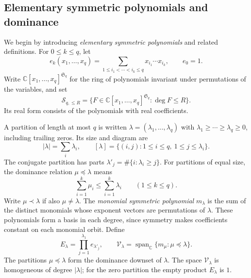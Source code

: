 \documentclass[reqno, 12pt]{article}
\numberwithin{equation}{section}
\theoremstyle{definition}
\newcommand{\CC}{\mathbb C}
\begin{document}
\subsection{Elementary symmetric polynomials and dominance}

We begin by introducing \emph{elementary symmetric polynomials} and related definitions.
For $0\leq k\leq q$, let
\[
e_k(x_1,\ldots,x_q)=
\sum_{1\leq i_1<\cdots<i_k\leq q}x_{i_1}\cdots x_{i_k},
\qquad e_0=1.
\]
Write $\CC[x_1,\ldots,x_q]^{\mathfrak S_q}$ for the ring of
polynomials invariant under permutations of the variables, and set
\[
\mathcal S_{q,\leq R}
=\{F\in\CC[x_1,\ldots,x_q]^{\mathfrak S_q}:\deg F\leq R\}.
\]
Its real form consists of the polynomials with real coefficients.

A partition of length at most $q$ is written
$\lambda=(\lambda_1,\ldots,\lambda_q)$ with
$\lambda_1\geq\cdots\geq\lambda_q\geq0$, including trailing zeros.
Its size and diagram are
\[
|\lambda|=\sum_i\lambda_i,
\qquad
[\lambda]=\{(i,j):1\leq i\leq q,\ 1\leq j\leq\lambda_i\}.
\]
The conjugate partition has parts
$\lambda'_j=\#\{i:\lambda_i\geq j\}$.
For partitions of equal size, the dominance relation
$\mu\preceq\lambda$ means
\begin{equation}\label{st:dominance}
\sum_{i=1}^k\mu_i\leq\sum_{i=1}^k\lambda_i
\qquad(1\leq k\leq q).
\end{equation}
Write $\mu\prec\lambda$ if also $\mu\ne\lambda$.
The \emph{monomial symmetric polynomial} $m_\lambda$ is the sum of the
distinct monomials whose exponent vectors are permutations of
$\lambda$.  These polynomials form a basis in each degree, since symmetry makes coefficients constant on each monomial orbit.
Define
\begin{equation}\label{st:elementary-product}
E_\lambda=\prod_{j=1}^{\lambda_1}e_{\lambda'_j},
\qquad
\mathcal V_\lambda
=\operatorname{span}_{\CC}
 \{m_\mu:\mu\preceq\lambda\}.
\end{equation}
The partitions $\mu\preceq\lambda$ form the dominance downset of
$\lambda$.  The space $\mathcal V_\lambda$ is homogeneous of
degree $|\lambda|$; for the zero partition the empty product
$E_\lambda$ is $1$.
\end{document}
